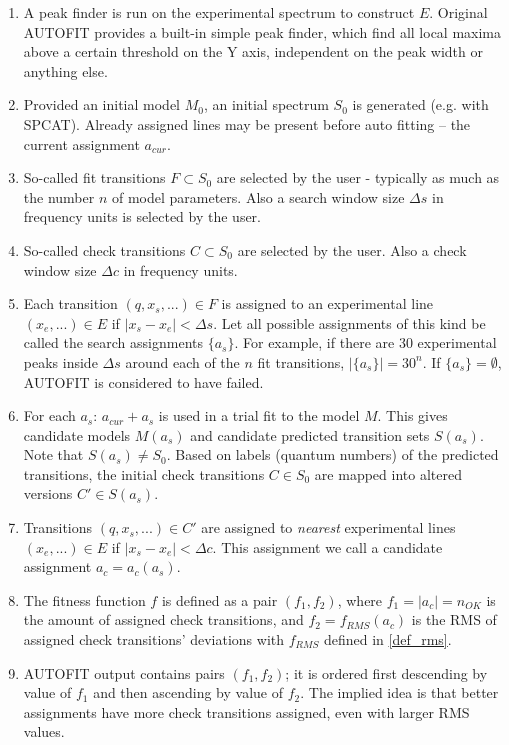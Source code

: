 \documentclass[11pt]{article}
\begin{document}
\begin{enumerate}
	\item A peak finder is run on the experimental spectrum to construct $E$. Original AUTOFIT provides a built-in simple peak finder, which find all local maxima above a certain threshold on the Y axis, independent on the peak width or anything else. 
	\item Provided an initial model $M_0$, an initial spectrum $S_0$ is generated (e.g. with SPCAT). Already assigned lines may be present before auto fitting -- the current assignment $a_{cur}$.
	\item So-called fit transitions $F \subset S_0$ are selected by the user - typically as much as the number $n$ of model parameters. Also a search window size $\Delta s$ in frequency units is selected by the user.
	\item So-called check transitions $C \subset S_0$ are selected by the user. Also a check window size $\Delta c$ in frequency units. 
	
		\item Each transition $(q, x_s, ...) \in F$ is assigned to an experimental line $(x_e, ...) \in E$ if $|x_s - x_e| < \Delta s$. Let all possible assignments of this kind be called the search assignments $\{a_s\}$. For example, if there are 30 experimental peaks inside $\Delta s$ around each of the $n$ fit transitions, $|\{a_s\}| = 30^{n}$. If $\{a_s\} = \emptyset$, AUTOFIT is considered to have failed. 
		\item For each $a_s$: $a_{cur} + a_s$ is used in a trial fit to the model $M$. This gives candidate models $M(a_s)$ and candidate predicted transition sets $S(a_s)$. Note that $S(a_s) \neq S_0$. Based on labels (quantum numbers) of the predicted transitions, the initial check transitions $C \in S_0$ are mapped into altered versions $C' \in S(a_s)$. 

		\item Transitions $(q, x_s, ...) \in C'$ are assigned to \emph{nearest} experimental lines $(x_e, ...) \in E$ if $|x_s - x_e| < \Delta c$. This assignment we call a candidate assignment $a_c = a_c(a_s)$. %
		
	\item The fitness function $f$ is defined as a pair $(f_1, f_2)$, where $f_1 = |a_c| = n_{OK}$ is the amount of assigned check transitions, and $f_2 = f_{RMS}(a_c)$ is the RMS of assigned check transitions' deviations with $f_{RMS}$ defined in \ref{def_rms}. 
	\item AUTOFIT output contains pairs $(f_1, f_2)$; it is ordered first descending by value of $f_1$ and then ascending by value of $f_2$. The implied idea is that better assignments have more check transitions assigned, even with larger RMS values. 
	

\end{enumerate}
\end{document}
